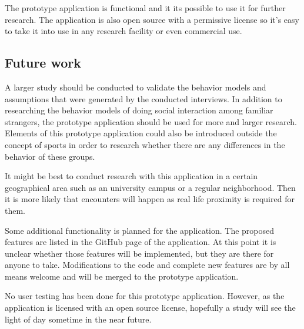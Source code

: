 The prototype application is functional and it its possible to use it for further research. The application is also open source with a permissive license so it's easy to take it into use in any research facility or even commercial use.

\subsection{Future work}

A larger study should be conducted to validate the behavior models and assumptions that were generated by the conducted interviews. In addition to researching the behavior models of doing social interaction among familiar strangers, the prototype application should be used for more and larger research. Elements of this prototype application could also be introduced outside the concept of sports in order to research whether there are any differences in the behavior of these groups.

It might be best to conduct research with this application in a certain geographical area such as an university campus or a regular neighborhood. Then it is more likely that encounters will happen as real life proximity is required for them.

Some additional functionality is planned for the application. The proposed features are listed in the GitHub page of the application. At this point it is unclear whether those features will be implemented, but they are there for anyone to take. Modifications to the code and complete new features are by all means welcome and will be merged to the prototype application.

No user testing has been done for this prototype application. However, as the application is licensed with an open source license, hopefully a study will see the light of day sometime in the near future.

